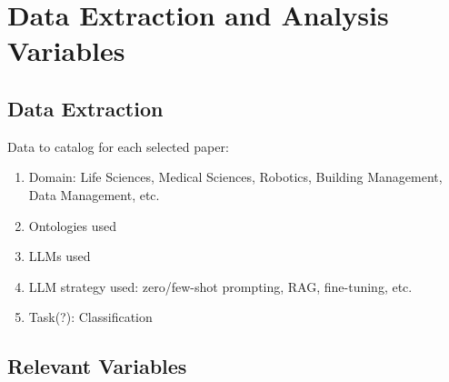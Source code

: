 \documentclass[a4paper,colorinlistoftodos]{article}
\begin{document}

\section{Data Extraction and Analysis Variables}
\label{sec:data-extraction-analysis-variables}

\subsection{Data Extraction}
\label{subsec:data-extraction}

Data to catalog for each selected paper:
\begin{enumerate}
  \item Domain: Life Sciences, Medical Sciences, Robotics, Building
    Management, Data Management, etc.
  \item Ontologies used
  \item LLMs used
  \item LLM strategy used: zero/few-shot prompting, RAG, fine-tuning, etc.
  \item Task(?): Classification
  \end{enumerate}

\subsection{Relevant Variables}
\label{subsec:relevant-variables}
\end{document}
